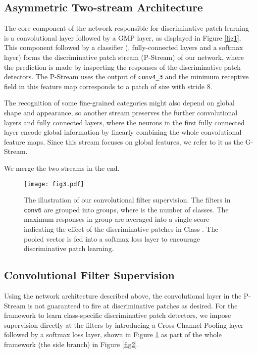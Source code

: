 \documentclass[10pt,twocolumn,letterpaper]{article}
\begin{document}
\subsection{Asymmetric Two-stream Architecture} \label{sec3_2}
The core component of the network responsible for discriminative patch learning is a  convolutional
layer followed by a GMP layer, as displayed in Figure \ref{fig1}. 
This component followed by a classifier (\eg, fully-connected layers and a softmax layer) forms the discriminative patch
stream (P-Stream) of our network, where the prediction is made by inspecting the responses of the discriminative patch
detectors. The P-Stream uses the output of \texttt{conv4\_3} and the minimum receptive field in
this feature map corresponds to a patch of size  with stride 8.

The recognition of some fine-grained categories might also depend on global shape and appearance, so another stream
preserves the further convolutional layers
and fully connected layers, where the neurons in the first fully connected layer encode global information by
linearly combining the whole convolutional feature maps. Since this stream focuses on global features, we refer to it as the G-Stream.

We merge the two streams in the end.

\begin{figure}
\begin{center}
\texttt{[image: fig3.pdf]}
\end{center}
\vspace{-10pt}
   \caption{\label{fig3} The illustration of our convolutional filter supervision. The filters in \texttt{conv6} are
   grouped into  groups, where  is the number of classes. The maximum responses in group  are averaged
   into a single score indicating the effect of the discriminative patches in Class . The pooled vector is
   fed into a softmax loss layer to encourage discriminative patch learning.}
\end{figure}

\subsection{Convolutional Filter Supervision} \label{sec3_3}
Using the network architecture described above, the  convolutional layer in the P-Stream is not guaranteed to fire at
discriminative patches as desired. For the framework to learn class-specific discriminative patch detectors, we impose supervision
directly at the  filters by introducing a Cross-Channel Pooling layer followed by a softmax loss layer,
shown in Figure \ref{fig3} as part of the whole framework (the side branch) in Figure \ref{fig2}.
\end{document}
